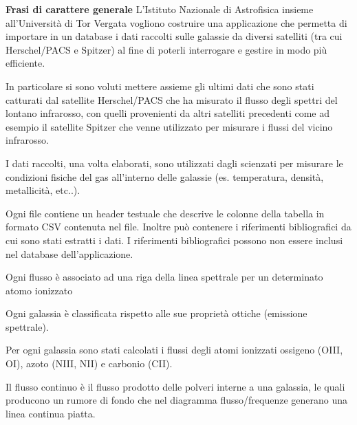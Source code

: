 \documentclass[12pt,a4paper,onecolumn]{article}
\begin{document}
	\begin{framed}
		\begin{flushleft}
			\textbf{Frasi di carattere generale}\newline
			L’Istituto Nazionale di Astrofisica insieme all’Università di Tor Vergata vogliono costruire una applicazione che permetta di importare in un database i dati raccolti sulle galassie da diversi satelliti (tra cui Herschel/PACS e Spitzer) al fine di poterli interrogare e gestire in modo più efficiente.\newline
			
			In particolare si sono voluti mettere assieme gli ultimi dati che sono stati catturati dal satellite Herschel/PACS che ha misurato il flusso degli spettri del lontano infrarosso, con quelli provenienti da altri satelliti precedenti come ad esempio il satellite Spitzer che venne utilizzato per misurare i flussi del vicino infrarosso.\newline
			
			I dati raccolti, una volta elaborati, sono utilizzati dagli scienzati per misurare le condizioni fisiche del gas all’interno delle galassie (es. temperatura, densità, metallicità, etc..).\newline
			
			Ogni file contiene un header testuale che descrive le colonne della tabella in formato CSV contenuta nel file. Inoltre può contenere i riferimenti bibliografici da cui sono stati estratti i dati. I riferimenti bibliografici possono non essere inclusi nel database dell'applicazione.\newline
			
			Ogni flusso è associato ad una riga della linea spettrale per un determinato atomo ionizzato\newline
			
			Ogni galassia è classificata rispetto alle sue proprietà ottiche (emissione spettrale).\newline
			
			Per ogni galassia sono stati calcolati i flussi degli atomi ionizzati ossigeno (OIII, OI), azoto (NIII, NII) e carbonio (CII).\newline
			
			Il flusso continuo è il flusso prodotto delle polveri interne a una galassia, le quali producono un rumore di fondo che nel diagramma flusso/frequenze generano una linea continua piatta.
		\end{flushleft}
	\end{framed}
\end{document}
